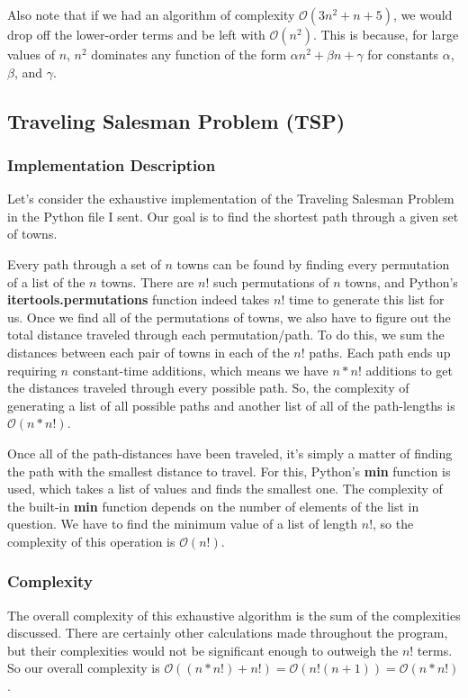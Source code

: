 \documentclass[11pt]{article}
\begin{document}
Also note that if we had an algorithm of complexity $\mathcal{O}(3n^2 + n + 5)$,
we would drop off the lower-order terms and be left with $\mathcal{O}(n^2)$.
This is because, for large values of $n$, $n^2$ dominates any function of the
form $\alpha n^2 + \beta n + \gamma$ for constants $\alpha$, $\beta$, and
$\gamma$.

\subsection{Traveling Salesman Problem (TSP)}
\subsubsection{Implementation Description}
Let's consider the exhaustive implementation of the Traveling Salesman Problem
in the Python file I sent. Our goal is to find the shortest path through a given
set of towns.

Every path through a set of $n$ towns can be found by finding every permutation
of a list of the $n$ towns. There are $n!$ such permutations of $n$ towns, and
Python's \textbf{itertools.permutations} function indeed takes $n!$ time to
generate this list for us. Once we find all of the permutations of towns, we
also have to figure out the total distance traveled through each
permutation/path. To do this, we sum the distances between each pair of towns in
each of the $n!$ paths. Each path ends up requiring $n$ constant-time additions,
which means we have $n * n!$ additions to get the distances traveled through
every possible path. So, the complexity of generating a list of all possible
paths and another list of all of the path-lengths is $\mathcal{O}(n * n!)$.

Once all of the path-distances have been traveled, it's simply a matter of
finding the path with the smallest distance to travel. For this, Python's
\textbf{min} function is used, which takes a list of values and finds the
smallest one. The complexity of the built-in \textbf{min} function depends on
the number of elements of the list in question. We have to find the minimum
value of a list of length $n!$, so the complexity of this operation is
$\mathcal{O}(n!)$.

\subsubsection{Complexity}
The overall complexity of this exhaustive algorithm is the sum of the
complexities discussed. There are certainly other calculations made throughout
the program, but their complexities would not be significant enough to outweigh
the $n!$ terms. So our overall complexity is $\mathcal{O}((n * n!) + n!) =
\mathcal{O}(n! (n + 1)) = \mathcal{O}(n * n!)$.
\end{document}
